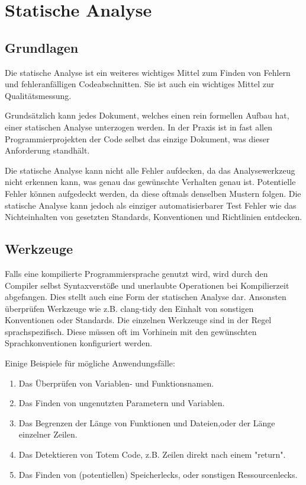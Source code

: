\documentclass[	%
		fontsize=11pt,  %
		a4paper,	    %
		ngerman,		%
		sans,			%
		f4,				%
	]{HsH-report}		%
\begin{document}
\section{Statische Analyse}

\subsection{Grundlagen}

Die statische Analyse ist ein weiteres wichtiges Mittel zum Finden von Fehlern
und fehleranfälligen Codeabschnitten. Sie ist auch ein wichtiges Mittel zur
Qualitätsmessung.

Grundsätzlich kann jedes Dokument, welches einen rein formellen Aufbau hat,
einer statischen Analyse unterzogen werden. In der Praxis ist in fast allen
Programmierprojekten der Code selbst das einzige Dokument, was dieser
Anforderung standhält.

Die statische Analyse kann nicht alle Fehler aufdecken, da das Analysewerkzeug
nicht erkennen kann, was genau das gewünschte Verhalten genau ist. Potentielle
Fehler können aufgedeckt werden, da diese oftmals denselben Mustern folgen. Die
statische Analyse kann jedoch als einziger automatisierbarer Test Fehler wie
das Nichteinhalten von gesetzten Standards, Konventionen und Richtlinien
entdecken.

\subsection{Werkzeuge}

Falls eine kompilierte Programmiersprache genutzt wird, wird durch den Compiler
selbst Syntaxverstöße und unerlaubte Operationen bei Kompilierzeit abgefangen.
Dies stellt auch eine Form der statischen Analyse dar. Ansonsten überprüfen
Werkzeuge wie z.B. clang-tidy \cite{clang:tidy} den Einhalt von sonstigen
Konventionen oder Standards. Die einzelnen Werkzeuge sind in der Regel
sprachspezifisch. Diese müssen oft im Vorhinein mit den gewünschten
Sprachkonventionen konfiguriert werden.

Einige Beispiele für mögliche Anwendungsfälle:
\begin{enumerate}
	\item Das Überprüfen von Variablen- und Funktionsnamen.
	\item Das Finden von ungenutzten Parametern und Variablen.
	\item Das Begrenzen der Länge von Funktionen und Dateien,oder der Länge einzelner
	      Zeilen.
	\item Das Detektieren von Totem Code, z.B. Zeilen direkt nach einem "return".
	\item Das Finden von (potentiellen) Speicherlecks, oder sonstigen Ressourcenlecks.
\end{enumerate}
\end{document}
